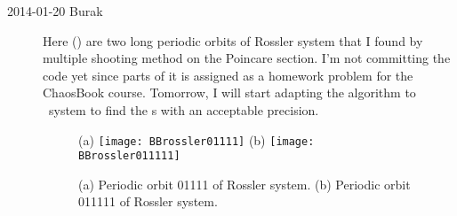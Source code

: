 \begin{description}
\item[2014-01-20 Burak] Here () are two long periodic
orbits of Rossler system that I found by multiple shooting method on the Poincare
section. I'm not committing the code yet since parts of it is assigned as a
homework problem for the ChaosBook course. Tomorrow, I will start adapting
the algorithm to \twomode\ system to find the \rpo s with an acceptable
precision.

\begin{figure}%
\centering
 (a) \texttt{[image: BBrossler01111]}
 (b) \texttt{[image: BBrossler011111]}
\caption{(a) Periodic orbit 01111 of Rossler system. (b) Periodic orbit 011111 of Rossler system.}
\label{fig:BBrosslerPO}
\end{figure}


\end{description}
